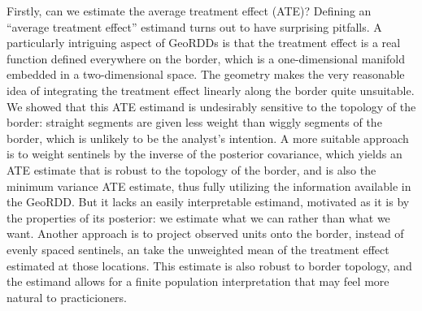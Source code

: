 \documentclass[letter]{article}
\begin{document}
    	Firstly, can we estimate the average treatment effect (ATE)?
Defining an ``average treatment effect'' estimand turns out to have surprising pitfalls.
A particularly intriguing aspect of GeoRDDs is that the treatment effect is a real function defined everywhere on the border, which is a one-dimensional manifold embedded in a two-dimensional space.
The geometry makes the very reasonable idea of integrating the treatment effect linearly along the border quite unsuitable.
We showed that this ATE estimand is undesirably sensitive to the topology of the border: straight segments are given less weight than wiggly segments of the border, which is unlikely to be the analyst's intention.
A more suitable approach is to weight sentinels by the inverse of the posterior covariance, which yields an ATE estimate that is robust to the topology of the border, and is also the minimum variance ATE estimate, thus fully utilizing the information available in the GeoRDD.
But it lacks an easily interpretable estimand, motivated as it is by the properties of its posterior: we estimate what we can rather than what we want.
Another approach is to project observed units onto the border, instead of evenly spaced sentinels, an take the unweighted mean of the treatment effect estimated at those locations.
This estimate is also robust to border topology, and the estimand allows for a finite population interpretation that may feel more natural to practicioners.
\end{document}
